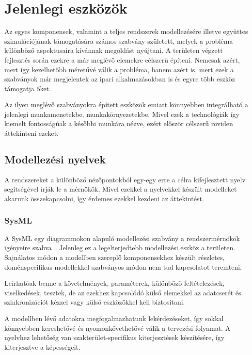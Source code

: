 \section{Jelenlegi eszközök}
Az egyes komponensek, valamint a teljes rendszerek modellezésére illetve együttes szimulációjának támogatására számos
szabvány született, melyek a probléma különböző aspektusaira kívánnak megoldást nyújtani. A területen végzett fejlesztés során
ezekre a már meglévő elemekre célszerű építeni. Nemcsak azért, mert így kezelhetőbb méretűvé válik a probléma, hanem azért is,
mert ezek a szabványok már megjelentek az ipari alkalmazásokban is és egyre több eszköz támogatja őket.

Az ilyen meglévő szabványokra épített eszközök emiatt könnyebben integrálható a jelenlegi munkamenetekbe,
munkakörnyezetekbe. Mivel ezek a technológiák így kiemelt fontosságúak a későbbi munkára nézve, ezért
először célszerű röviden áttekinteni ezeket.

    \subsection{Modellezési nyelvek}
    A rendszereket a különböző nézőpontokból egy-egy erre a célra kifejlesztett nyelv segítségével írják le a mérnökök,
    Mivel ezekkel a nyelvekkel készült modelleket akarunk összekapcsolni, így érdemes ezekkel kezdeni az áttekintést.
        
        \subsubsection{SysML}
        A SysML egy diagrammokon alapuló modellezési szabvány a rendszermérnökök igényeire szabva~\cite{Bajaj_2022}.
        Jelenleg ez a legelterjedtebb modellezési eszköz a területen. Sajnálatos módon a modellben szereplő
        komponensekhez készült részletes, doménspecifikus modellekkel szabványos módon nem tud kapcsolatot teremteni.
        
        Leírhatóak benne a követelmények, paraméterek, különböző feltételezések, viselkedések, tesztek, de az
        ezekhez kapcsolódó külső elemekkel az adatcserét és szinkronizációt kézzel vagy külső eszközökkel
        kell biztosítani.
        
        A modellben lévő adatokra megfogalmazhatunk lekérdezéseket, így sokkal
        könnyebben kereshetővé és nyomonkövethetővé válik a tervezési folyamat. A nyelvhez lehetőség van
        szakterület-specifikus kiterjesztések készítésére, így kiterjesztve a képességeit.

